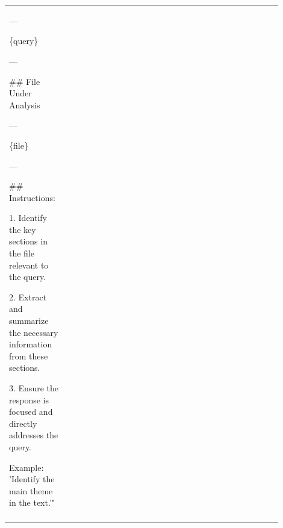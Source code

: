 \documentclass{article}
\theoremstyle{plain}
\theoremstyle{definition}
\theoremstyle{remark}
\begin{document}
\begin{table}[t!]
\begin{tabular}{|p{0.2\linewidth}|p{0.7\linewidth}|}
---

\{query\}

---

\#\#  File Under Analysis

---

\{file\}

---

\#\# Instructions:

1. Identify the key sections in the file relevant to the query.

2. Extract and summarize the necessary information from these sections.

3. Ensure the response is focused and directly addresses the query.

Example: 'Identify the main theme in the text.'" 
\\
    \Xhline{1.2pt}
  \end{tabular}
\end{table}
\end{document}
